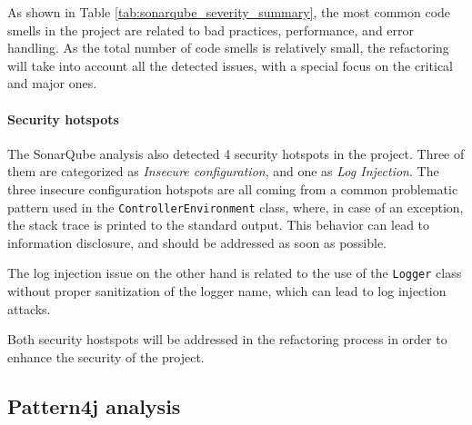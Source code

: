 \noindent As shown in Table \ref{tab:sonarqube_severity_summary}, the most common code smells in the project are related to bad practices, performance, and error handling. As the total number of code smells is relatively small, the refactoring will take into account all the detected issues, with a special focus on the critical and major ones.

\paragraph*{Security hotspots} The SonarQube analysis also detected 4 security hotspots in the project. Three of them are categorized as \textit{Insecure configuration}, and one as \textit{Log Injection}. The three insecure configuration hotspots are all coming from a common problematic pattern used in the \texttt{ControllerEnvironment} class, where, in case of an exception, the stack trace is printed to the standard output. This behavior can lead to information disclosure, and should be addressed as soon as possible.

The log injection issue on the other hand is related to the use of the \texttt{Logger} class without proper sanitization of the logger name, which can lead to log injection attacks.

Both security hostspots will be addressed in the refactoring process in order to enhance the security of the project.

\subsection{Pattern4j analysis}


